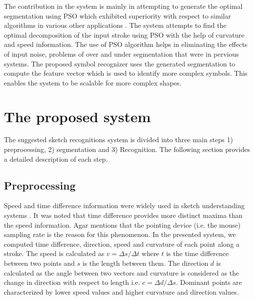 \documentclass{article}
\begin{document}
The contribution in the system is mainly in attempting to generate the optimal segmentation using PSO which exhibited superiority with respect to similar algorithms in various other applications \cite{PolygonApproximationPSO}. The system attempts to find the optimal decomposition of the input stroke using PSO with the help of curvature and speed information. The use of PSO algorithm helps in eliminating the effects of input noise, problems of over and under segmentation that were in pervious systems. The proposed symbol recognizer uses the generated segmentation to compute the feature vector which is used to identify more complex symbols. This enables the system to be scalable for more complex shapes. 

 
\section{The proposed system}
\label{Sysdisc}
 The suggested sketch recognitions system is divided into three main steps 1) preprocessing, 2) segmentation and 3) Recognition. The following section provides a detailed description of each step.
\subsection{Preprocessing}
\label{Prepross}
 Speed and time difference information were widely used in sketch understanding systems \cite{earlyprocess}. It was noted that time difference provides more distinct maxima than the speed information. Agar \cite{polygonfeedback31} mentions that the pointing device (i.e. the mouse) sampling rate is the reason for this phenomenon. 
 In the presented system, we computed time difference, direction, speed and curvature of each point along a stroke. The speed is calculated as $v=\Delta s/\Delta t$ where $t$ is the time difference between two points and $s$ is the length between them. The direction $d$ is calculated as the angle between two vectors and curvature is considered as the change in direction with respect to length i.e. $c= \Delta d/\Delta s$. Dominant points are characterized by lower speed values and higher curvature and direction values.
  
\end{document}
